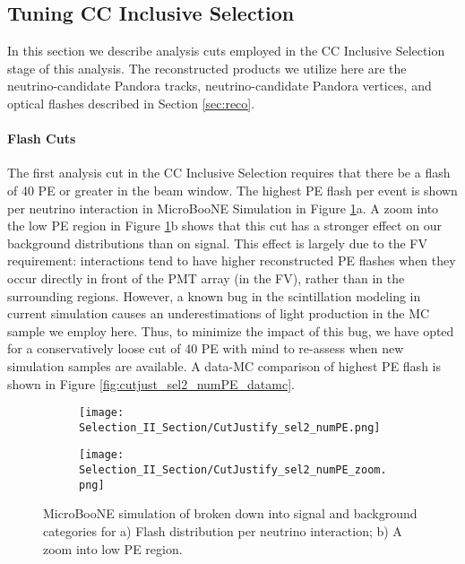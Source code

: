 


\subsection{Tuning CC Inclusive Selection}
In this section we describe analysis cuts employed in the CC Inclusive Selection stage of this analysis. The reconstructed products we utilize here are the neutrino-candidate Pandora tracks, neutrino-candidate Pandora vertices, and optical flashes described in Section \ref{sec:reco}. 

\paragraph{Flash Cuts}

The first analysis cut in the CC Inclusive Selection requires that there be a flash of 40 PE or greater in the beam window. The highest PE flash per event is shown per neutrino interaction in MicroBooNE Simulation in Figure \ref{fig:cutjust_sel2_numPE}a. A zoom into the low PE region in Figure \ref{fig:cutjust_sel2_numPE}b shows that this cut has a stronger effect on our background distributions than on signal. This effect is largely due to the FV requirement: interactions tend to have higher reconstructed PE flashes when they occur directly in front of the PMT array (in the FV), rather than in the surrounding regions. However, a known bug in the scintillation modeling in current simulation causes an underestimations of light production in the MC sample we employ here.  Thus, to minimize the impact of this bug, we have opted for a conservatively loose cut of 40 PE with mind to re-assess when new simulation samples are available.  A data-MC comparison of highest PE flash is shown in Figure \ref{fig:cutjust_sel2_numPE_datamc}.


\begin{figure}[H]
  \centering
  \begin{subfigure}[t]{0.4\textwidth}
    \texttt{[image: Selection\_II\_Section/CutJustify\_sel2\_numPE.png]}
    \caption{ }
  \end{subfigure}
    \hspace{15 mm}
   \begin{subfigure}[t]{0.4\textwidth}
    \texttt{[image: Selection\_II\_Section/CutJustify\_sel2\_numPE\_zoom.png]}
    \caption{ }
  \end{subfigure}
\caption{ MicroBooNE simulation of broken down into signal and background categories for a) Flash distribution per neutrino interaction; b) A zoom into low PE region. }
\label{fig:cutjust_sel2_numPE}
\end{figure}


